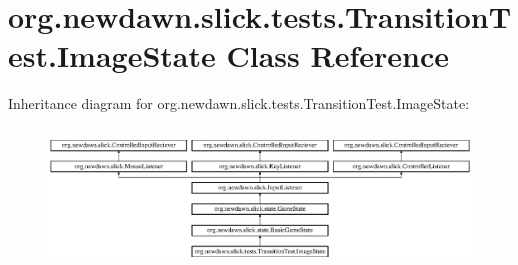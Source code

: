\hypertarget{classorg_1_1newdawn_1_1slick_1_1tests_1_1_transition_test_1_1_image_state}{}\section{org.\+newdawn.\+slick.\+tests.\+Transition\+Test.\+Image\+State Class Reference}
\label{classorg_1_1newdawn_1_1slick_1_1tests_1_1_transition_test_1_1_image_state}
Inheritance diagram for org.\+newdawn.\+slick.\+tests.\+Transition\+Test.\+Image\+State\+:\begin{figure}[H]
\begin{center}
\leavevmode
\includegraphics[height=3.720930cm]{classorg_1_1newdawn_1_1slick_1_1tests_1_1_transition_test_1_1_image_state}
\end{center}
\end{figure}
